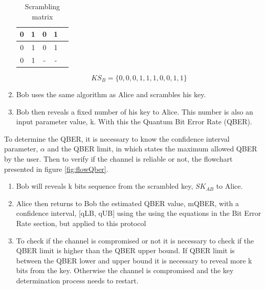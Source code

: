 \begin{refsection}
\begin{enumerate}
	\begin{table}[hbt]
		\centering
		\caption{Scrambling matrix}
		\label{tb:scram}
		\begin{tabular}{|c|c|c|c|c|}
			\hline
				0 & 1 & 0 & 1 \\ \hline
			    0 & 1 & 0 & 1 \\ \hline
				0 & 1 & - & - \\ \hline
		\end{tabular}
	\end{table}

	$$KS_{B} = \{0,0,0,1,1,1,0,0,1,1\}$$	
	
	\item Bob uses the same algorithm as Alice and scrambles his key.
	
	\item Bob then reveals a fixed number of his key to Alice. This number is also an input parameter value, k. With this the Quantum Bit Error Rate (QBER).
		
\end{enumerate}

	To determine the QBER, it is necessary to know the confidence interval parameter, $\alpha$ and the QBER limit, in which states the maximum allowed QBER by the user.
	Then to verify if the channel is reliable or not, the flowchart presented in figure \ref{fig:flowQber}.
	
	\begin{enumerate}
		\item Bob will reveals k bits sequence from the scrambled key, $SK_{AB}$ to Alice.
		\item Alice then returns to Bob the estimated QBER value, mQBER, with a confidence interval, [qLB, qUB] using the using the equations in the Bit Error Rate section, but applied to this protocol
		\item To check if the channel is compromised or not it is necessary to check if the QBER limit is higher than the QBER upper bound. If QBER limit is between the QBER lower and upper bound it is necessary to reveal more k bits from the key. Otherwise the channel is compromised and the key determination process needs to restart.
	\end{enumerate}
	

\end{refsection}
